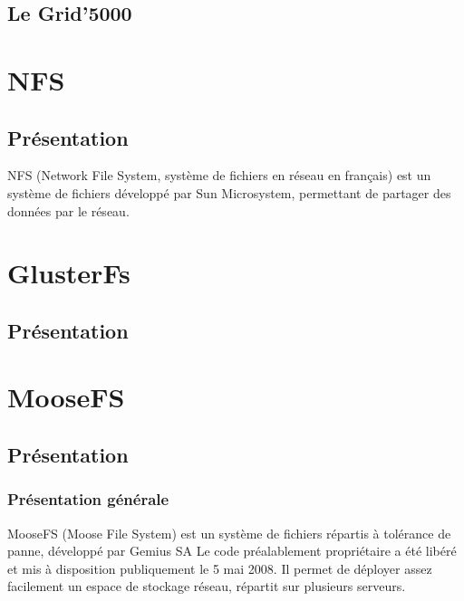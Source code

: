\documentclass[12pt]{report}
\begin{document}
		\section{Le Grid'5000}

	\chapter{NFS}
		\section{Présentation}

		NFS (Network File System, système de fichiers en réseau en français) est un système de fichiers développé par Sun Microsystem,
		permettant de partager des données par le réseau.

	\chapter{GlusterFs}
		\section{Présentation}

	\chapter{MooseFS}
		\section{Présentation}

		\subsection{Présentation générale}
    
			
			MooseFS (Moose File System) est un système de fichiers répartis à tolérance de panne, développé par Gemius SA
			Le code préalablement propriétaire a été libéré et mis à disposition publiquement le 5 mai 2008.
			Il permet de déployer assez facilement un espace de stockage réseau, répartit sur plusieurs serveurs.
			
\end{document}
